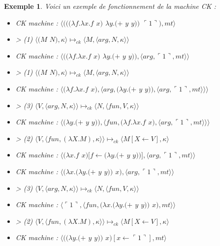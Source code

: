 \documentclass[10pt,a4paper]{report}
\newtheorem{ex}{Exemple}
\begin{document}
	\begin{ex}\label{CK} Voici un exemple de fonctionnement de la machine CK :
		\medbreak
		
		\begin{itemize}
			\item[] CK machine : $\langle(((\lambda f.\lambda x.f$ $x)$ $\lambda y.(+$ $y$ $y))$ $\ulcorner 1\urcorner),mt\rangle$
			\item[] > (1) $\langle(M$ $N),\kappa\rangle \longmapsto_{ck} \langle M,\langle arg,N,\kappa\rangle\rangle$
			\item[] CK machine : $\langle((\lambda f.\lambda x.f$ $x)$ $\lambda y.(+$ $y$ $y)),\langle arg,\ulcorner 1\urcorner,mt\rangle\rangle$
			\item[] > (1) $\langle(M$ $N),\kappa\rangle \longmapsto_{ck} \langle M,\langle arg,N,\kappa\rangle\rangle$
			\item[] CK machine : $\langle(\lambda f.\lambda x.f$ $x),\langle arg,(\lambda y.(+$ $y$ $y)),\langle arg,\ulcorner 1\urcorner,mt\rangle\rangle\rangle$	
			\item[] > (3) $\langle V,\langle arg,N,\kappa \rangle \rangle \longmapsto_{ck} \langle N,\langle fun,V,\kappa \rangle \rangle$
			\item[] CK machine : $\langle(\lambda y.(+$ $y$ $y)),\langle fun,(\lambda f.\lambda x.f$ $x),\langle arg,\ulcorner 1\urcorner,mt\rangle\rangle\rangle$	
			\item[] > (2) $\langle V,\langle fun,(\lambda X.M),\kappa \rangle \rangle \longmapsto_{ck} \langle M[X \leftarrow V],\kappa\rangle$
			\item[] CK machine : $\langle(\lambda x.f$ $x)[f\leftarrow(\lambda y.(+$ $y$ $y))],\langle arg,\ulcorner 1\urcorner,mt\rangle\rangle$	
			\item[] CK machine : $\langle(\lambda x.(\lambda y.(+$ $y$ $y))$ $x),\langle arg,\ulcorner 1\urcorner,mt\rangle\rangle$	
			\item[] > (3) $\langle V,\langle arg,N,\kappa \rangle \rangle \longmapsto_{ck} \langle N,\langle fun,V,\kappa \rangle \rangle$
			\item[] CK machine : $\langle\ulcorner 1\urcorner,\langle fun,(\lambda x.(\lambda y.(+$ $y$ $y))$ $x),mt\rangle\rangle$
			\item[] > (2) $\langle V,\langle fun,(\lambda X.M),\kappa \rangle \rangle \longmapsto_{ck} \langle M[X \leftarrow V],\kappa\rangle$		
			\item[] CK machine : $\langle((\lambda y.(+$ $y$ $y))$ $x)[x \leftarrow \ulcorner 1\urcorner ],mt\rangle$

\end{itemize}
\end{ex}
\end{document}
